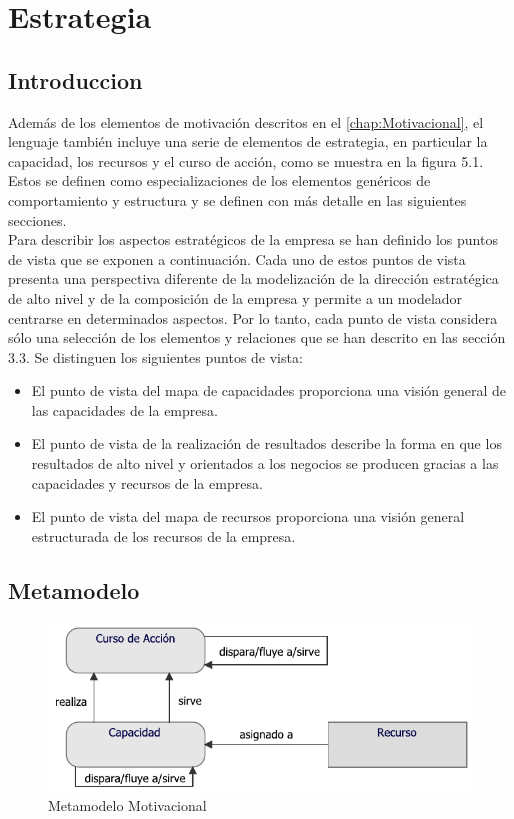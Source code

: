 \chapter{Estrategia}
\section{Introduccion}
Además de los elementos de motivación descritos en el \autoref{chap:Motivacional}, el lenguaje también incluye una serie de elementos de estrategia, en particular la capacidad, los recursos y el curso de acción, como se muestra en la figura 5.1. Estos se definen como especializaciones de los elementos genéricos de comportamiento y estructura y se definen con más detalle en las siguientes secciones. \\

Para describir los aspectos estratégicos de la empresa se han definido los puntos de vista que se exponen a continuación. Cada uno de estos puntos de vista presenta una perspectiva diferente de la modelización de la dirección estratégica de alto nivel y de la composición de la empresa y permite a un modelador centrarse en determinados aspectos. Por lo tanto, cada punto de vista considera sólo una selección de los elementos y relaciones que se han descrito en las sección 3.3. Se distinguen los siguientes puntos de vista:

\begin{itemize}
	\item El punto de vista del mapa de capacidades proporciona una visión general de las capacidades de la empresa.
	\item El punto de vista de la realización de resultados describe la forma en que los resultados de alto nivel y orientados a los negocios se producen gracias a las capacidades y recursos de la empresa.
	\item El punto de vista del mapa de recursos proporciona una visión general estructurada de los recursos de la empresa.
\end{itemize}

\newpage

\section{Metamodelo}
\begin{figure}[h!]
	\centering
	\includegraphics[width=0.9\linewidth]{imgs/meta/Estrategia}
	\caption{Metamodelo Motivacional}
\end{figure}

